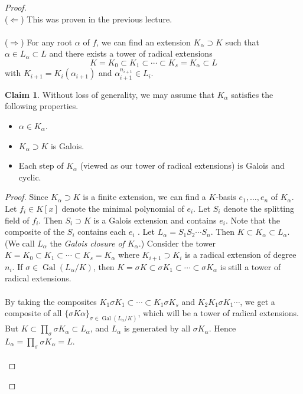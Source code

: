 \documentclass[10pt,letterpaper,cm]{nupset}
\theoremstyle{definition}
\newtheorem{claim}{Claim}
\newcommand{\1}{\mathbf{1}}
\newcommand{\0}{\vec 0}
\DeclareMathOperator{\gal}{Gal}
\begin{document}
\begin{proof} $ $
\\
($\Longleftarrow$) This was proven in the previous lecture.
\\ \\
($\Longrightarrow$) For any root $\alpha$ of $f$, we can find an extension $K_{\alpha} \supset K$ such that  $\alpha \in L_{\alpha} \subset L$ and there exists a tower of radical extensions $$ K = K_0 \subset K_1 \subset \cdots \subset K_s = K_{\alpha} \subset L$$ with $K_{i+1} = K_i(\alpha_{i+1})$ and $\alpha_{i+1}^{n_{i+1}} \in L_i$. 
\begin{claim}
Without loss of generality, we may assume that $K_{\alpha}$ satisfies the following properties.
\begin{itemize}
\item $\alpha \in K_{\alpha}$.
\item $K_{\alpha} \supset K$ is Galois.
\item Each step of $K_{\alpha}$ (viewed as our tower of radical extensions) is Galois and cyclic. 
\end{itemize}
\end{claim}
\begin{proof}
Since $K_{\alpha}\supset K$ is a finite extension, we can find a $K$-basis $e_1, \ldots, e_n$ of $K_{\alpha}$. Let $f_i \in K[x]$ denote the minimal polynomial of $e_i$. Let $S_i$ denote the splitting field of $f_i$. Then $S_i \supset K$ is a Galois extension and contains $e_i$. Note that the composite of the $S_i$ contains each $e_i$ . Let $L_{\alpha} = S_1S_2 \cdots S_n$. Then $K \subset K_{\alpha} \subset L_{\alpha}$. (We call $L_{\alpha}$ the \textit{Galois closure of $K_{\alpha}$}.) Consider the tower $K = K_0 \subset K_1 \subset \cdots \subset K_s = K_{\alpha}$ where $K_{i+1} \supset K_i$ is a radical extension of degree $n_i$. If $\sigma \in \gal(L_{\alpha}/K)$, then $K = \sigma{K} \subset \sigma{K_1} \subset \cdots \subset \sigma{K_{\alpha}}$ is still a tower of radical extensions. 
\\ \\By taking the composites $K_1\sigma K_1 \subset \cdots \subset K_1\sigma K_s$ and $K_2K_1\sigma{K_1} \cdots$, we get  a composite of all $\{\sigma{K}{\alpha}\}_{\sigma \in \gal(L_{\alpha}/K)}$, which will be a tower of radical extensions. But $K \subset \prod_{\sigma} \sigma{K_{\alpha}} \subset L_{\alpha}$, and $L_{\alpha}$ is generated by all $\sigma{K_{\alpha}}$. Hence $L_{\alpha} = \prod_{\sigma} \sigma{K_{\alpha}} =L$.
\\ \\

\end{proof}
\end{proof}
\end{document}
